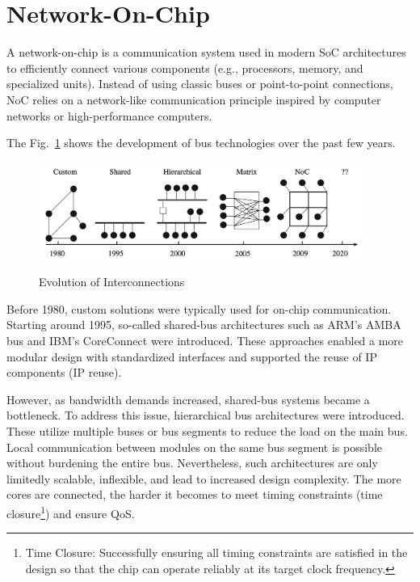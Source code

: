 \section{Network-On-Chip}

A network-on-chip is a communication system used in modern \acs{SoC} architectures to efficiently connect various components (e.g., processors, memory, and specialized units). Instead of using classic buses or point-to-point connections, \ac{NoC} relies on a network-like communication principle inspired by computer networks or high-performance computers.~\cite{serpanos_architecture_2011}

The Fig.~\ref{fig:Evolution_of_Interconnection} shows the development of bus technologies over the past few years.
\begin{figure}[htbp]
    \centering
    \includegraphics[width=0.95\textwidth]{img/Evolution of On-Chip communication interconnect.png}
    \caption{Evolution of Interconnections}\cite{abderazek_multicore_2013}\label{fig:Evolution_of_Interconnection}
\end{figure}

Before 1980, custom solutions were typically used for on-chip communication. Starting around 1995, so-called shared-bus architectures such as ARM’s AMBA bus \cite{arm_amba_nodate} and IBM’s CoreConnect\cite{international_business_machines_corporation_coreconnect_1999} were introduced. These approaches enabled a more modular design with standardized interfaces and supported the reuse of IP components (IP reuse).


However, as bandwidth demands increased, shared-bus systems became a bottleneck. To address this issue, hierarchical bus architectures were introduced. These utilize multiple buses or bus segments to reduce the load on the main bus. Local communication between modules on the same bus segment is possible without burdening the entire bus. Nevertheless, such architectures are only limitedly scalable, inflexible, and lead to increased design complexity. The more cores are connected, the harder it becomes to meet timing constraints (time closure\footnote{Time Closure: Successfully ensuring all timing constraints are satisfied in the design so that the chip can operate reliably at its target clock frequency.}) and ensure \ac{QoS}.


